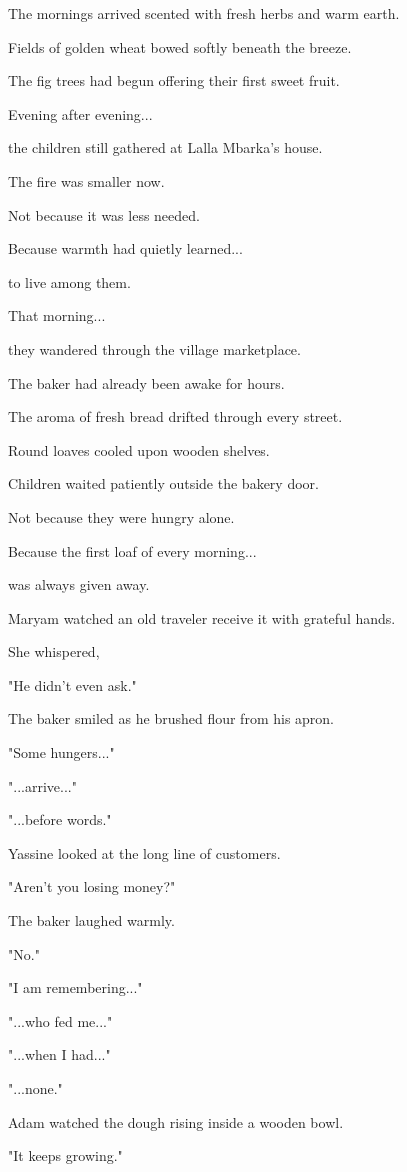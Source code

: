 \documentclass[12pt,openany]{book}
\begin{document}
The mornings arrived scented with fresh herbs and warm earth.

Fields of golden wheat bowed softly beneath the breeze.

The fig trees had begun offering their first sweet fruit.

Evening after evening...

the children still gathered at Lalla Mbarka's house.

The fire was smaller now.

Not because it was less needed.

Because warmth had quietly learned...

to live among them.

That morning...

they wandered through the village marketplace.

The baker had already been awake for hours.

The aroma of fresh bread drifted through every street.

Round loaves cooled upon wooden shelves.

Children waited patiently outside the bakery door.

Not because they were hungry alone.

Because the first loaf of every morning...

was always given away.

Maryam watched an old traveler receive it with grateful hands.

She whispered,

"He didn't even ask."

The baker smiled as he brushed flour from his apron.

"Some hungers..."

"...arrive..."

"...before words."

Yassine looked at the long line of customers.

"Aren't you losing money?"

The baker laughed warmly.

"No."

"I am remembering..."

"...who fed me..."

"...when I had..."

"...none."

Adam watched the dough rising inside a wooden bowl.

"It keeps growing."
\end{document}
